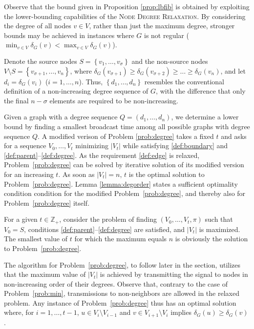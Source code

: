 Observe that the bound given in Proposition \ref{prop:lbfib} is obtained by exploiting the lower-bounding capabilities of the \textsc{Node Degree Relaxation}.
By considering the degree of all nodes $v\in V$, rather than just the maximum degree, stronger bounds may be achieved in instances where $G$ is not regular
($\min_{v\in V}\delta_G(v)<\max_{v\in V}\delta_G(v)$).

Denote the source nodes $S=\left\{v_1,\dots,v_{\sigma}\right\}$ and the non-source nodes $V\setminus S=\left\{v_{\sigma+1},\ldots,v_n\right\}$, where $\delta_G(v_{\sigma+1})\geq\delta_G(v_{\sigma+2})\geq\dots\geq\delta_G(v_n)$,
and let $d_i=\delta_G(v_i)$ ($i=1,\ldots,n$).
Thus, $\left\{d_1,\ldots,d_n\right\}$ resembles the conventional definition of a non-increasing degree sequence of $G$,
with the difference that only the final $n-\sigma$ elements are required to be non-increasing.

Given a graph with a degree sequence 
$Q=(d_1,\dots,d_n)$, we determine a lower bound by finding a smallest broadcast time among all possible graphs with degree sequence $Q$.
A modified verison of Problem \ref{prob:degree} takes a fixed $t$ and asks for a sequence $V_0,\dots,V_t$ minimizing $|V_t|$ while satisfying \ref{def:boundary} and \ref{def:parent}--\ref{def:degree}.
As the requirement \ref{def:edge} is relaxed, Problem~\ref{prob:degree} can be solved by iterative solution of its modified version for an increasing $t$.
As soon as $|V_t|=n$, $t$ is the optimal solution to Problem~\ref{prob:degree}.
Lemma \ref{lemma:degorder} states a sufficient optimality condition condition for the modified Problem~\ref{prob:degree}, and thereby also for Problem~\ref{prob:degree} itself.

For a given $t\in\mathbb{Z}_+$, consider the problem of finding $\left(V_0,\ldots,V_t,\pi\right)$ such that $V_0=S$,
conditions \ref{def:parent}--\ref{def:degree} are satisfied, and $\left|V_t\right|$ is maximized.
The smallest value of $t$ for which the maximum equals $n$ is obviously the solution to Problem~\ref{prob:degree}.

The algorithm for Problem~\ref{prob:degree}, to follow later in the section, utilizes that the maximum value of $\left|V_t\right|$
is achieved by transmitting the signal to nodes in non-increasing order of their degrees.
Observe that, contrary to the case of Problem~\ref{prob:min}, transmissions to non-neighbors are allowed in the relaxed problem.
Any instance of Problem~\ref{prob:degree} thus has an optimal solution where, for $i=1,\ldots,t-1$,
$u\in V_i\setminus V_{i-1}$ and $v\in V_{i+1}\setminus V_i$ implies $\delta_G(u)\geq\delta_G(v)$.

